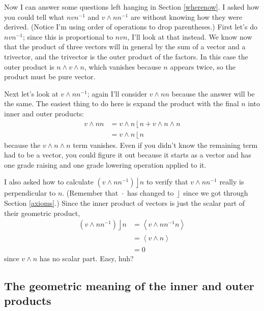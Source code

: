 \documentclass{utarticle}
\DeclareMathOperator{\inp}{\cdot}
\DeclareMathOperator{\lin}{\rfloor}
\DeclareMathOperator{\rin}{\lfloor}
\DeclareMathOperator{\out}{\wedge}
\newcommand{\grade}[2][]{\ensuremath{\left\langle #2 \right\rangle_{#1}}}
\begin{document}
Now I can answer some questions left hanging in Section \ref{wherenow}.  I asked 
how you could tell what $n v n^{-1}$ and $v \out n n^{-1}$ are without knowing how 
they were derived.  (Notice I'm using order of operations to drop parentheses.)  First 
let's do $n v n^{-1}$; since this is proportional to $n v n$, I'll look at that instead.  We 
know now that the product of three vectors will in general 
by the sum of a vector and a trivector, and the trivector is the outer product of the
factors.  In this case the outer product is $n \out v \out n$, which vanishes 
because $n$ appears twice, so the product must be pure vector.

Next let's look at $v \out n n^{-1}$; again I'll consider $v \out n n$ because 
the answer will be the same.  The easiest thing to do here is expand the product
with the final $n$ into inner and outer products:
\begin{align}
v \out n n & = v \out n \rin n + v \out n \out n \nonumber \\
 & = v \out n \rin n
\end{align}
because the $v \out n \out n$ term vanishes.  Even if you didn't 
know the remaining term had to be a vector, you could figure it out because it starts 
as a vector and has one grade raising and one grade lowering operation applied to it.  

I also asked how to calculate $\left(v \out n n^{-1}\right) \lin n$ to verify that 
$v \out n n^{-1}$ really is perpendicular to $n$.  (Remember that $\inp$ has changed 
to $\lin$ since we got through Section \ref{axioms}.)  Since the inner product of 
vectors is just the scalar part of their geometric product,
\begin{align}
(v \out n n^{-1}) \lin n & = \grade{v \out n n^{-1} n} \nonumber \\
 & = \grade{v \out n} \nonumber \\
 & = 0
\end{align}
since $v \out n$ has no scalar part.  Easy, huh?

\subsection{The geometric meaning of the inner and outer products}
\label{inneroutergeom}
\end{document}
